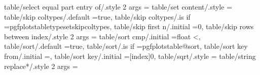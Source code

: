 {{{{{{{{{{{{{{{{{{{{{{{{{{{{{{{{{{{{{{{{{table/select equal part entry of/.style 2 args                     ={%
table/set content/.style                                           ={%
table/skip coltypes/.default                                       =true,                                                                                                                              
table/skip coltypes/.is if                                         =pgfplotstabletypesetskipcoltypes,                                                                                                  
table/skip first n/.initial                                        =0,                                                                                                                                 
table/skip rows between index/.style 2 args                        ={%
table/sort cmp/.initial                                            =float <,                                                                                                                           
table/sort/.default                                                =true,                                                                                                                              
table/sort/.is if                                                  =pgfplotstable@sort,                                                                                                                
table/sort key from/.initial                                       =,                                                                                                                                  
table/sort key/.initial                                            =[index]0,%
table/sqrt/.style                                                  ={%
table/string replace*/.style 2 args                                ={%
}}}}}}}}}}}}}}}}}}}}}}}}}}}}}}}}}}}}}}}}}}}}}}
